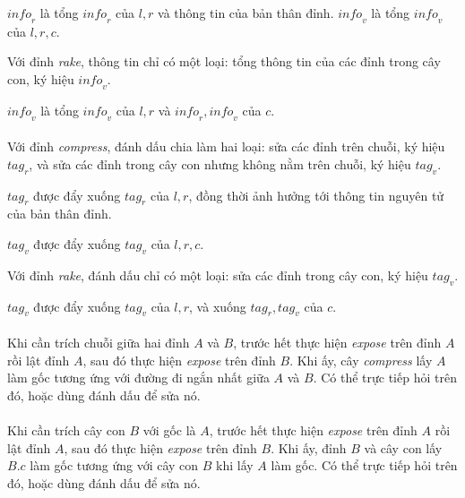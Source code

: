 \documentclass[11pt]{article}
\begin{document}
\(\mathit{info}_r\) là tổng \(\mathit{info}_r\) của \(l,r\) và thông tin của
bản thân đỉnh. \(\mathit{info}_v\) là tổng \(\mathit{info}_v\) của \(l,r,c\).

Với đỉnh \emph{rake}, thông tin chỉ có một loại: tổng thông tin của các đỉnh
trong cây con, ký hiệu \(\mathit{info}_v\).

\(\mathit{info}_v\) là tổng \(\mathit{info}_v\) của \(l,r\) và
\(\mathit{info}_r,\mathit{info}_v\) của \(c\).

\paragraph{}
Với đỉnh \emph{compress}, đánh dấu chia làm hai loại: sửa các đỉnh trên
chuỗi, ký hiệu \(\mathit{tag}_r\), và sửa các đỉnh trong cây con nhưng không
nằm trên chuỗi, ký hiệu \(\mathit{tag}_v\).

\(\mathit{tag}_r\) được đẩy xuống \(\mathit{tag}_r\) của \(l,r\), đồng thời
ảnh hưởng tới thông tin nguyên tử của bản thân đỉnh.

\(\mathit{tag}_v\) được đẩy xuống \(\mathit{tag}_v\) của \(l,r,c\).

Với đỉnh \emph{rake}, đánh dấu chỉ có một loại: sửa các đỉnh trong cây con,
ký hiệu \(\mathit{tag}_v\).

\(\mathit{tag}_v\) được đẩy xuống \(\mathit{tag}_v\) của \(l,r\), và xuống
\(\mathit{tag}_r,\mathit{tag}_v\) của \(c\).

\paragraph{}
Khi cần trích chuỗi giữa hai đỉnh \(A\) và \(B\), trước hết thực hiện
\emph{expose} trên đỉnh \(A\) rồi lật đỉnh \(A\), sau đó thực hiện
\emph{expose} trên đỉnh \(B\). Khi ấy, cây \emph{compress} lấy \(A\) làm gốc
tương ứng với đường đi ngắn nhất giữa \(A\) và \(B\). Có thể trực tiếp hỏi
trên đó, hoặc dùng đánh dấu để sửa nó.

\paragraph{}
Khi cần trích cây con \(B\) với gốc là \(A\), trước hết thực hiện
\emph{expose} trên đỉnh \(A\) rồi lật đỉnh \(A\), sau đó thực hiện
\emph{expose} trên đỉnh \(B\). Khi ấy, đỉnh \(B\) và cây con lấy \(B.c\) làm
gốc tương ứng với cây con \(B\) khi lấy \(A\) làm gốc. Có thể trực tiếp hỏi
trên đó, hoặc dùng đánh dấu để sửa nó.
\end{document}

